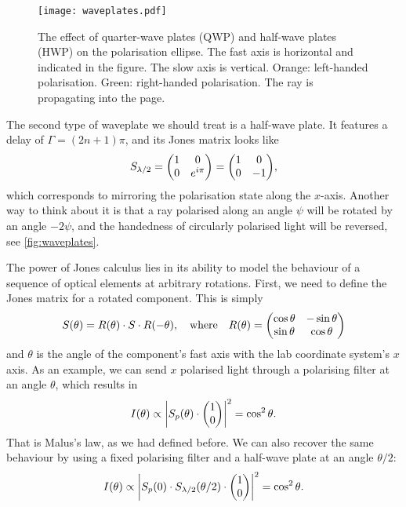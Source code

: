 \begin{figure}
	\centering
	\texttt{[image: waveplates.pdf]}
	\caption{
		The effect of quarter-wave plates (QWP) and half-wave plates (HWP) on the polarisation ellipse. The fast axis is horizontal and indicated in the figure. The slow axis is vertical. Orange: left-handed polarisation. Green: right-handed polarisation. The ray is propagating into the page.
	}
	\label{fig:waveplates}
\end{figure}

The second type of waveplate we should treat is a half-wave plate. It features a delay of $ \Gamma = (2n+1)\pi $, and its Jones matrix looks like
\begin{equation}
	S_\hwp = \mqty(1 & 0 \\ 0 & e^{i\pi}) = \mqty(1 & 0 \\ 0 & -1),
\end{equation}
which corresponds to mirroring the polarisation state along the $ x $-axis. Another way to think about it is that a ray polarised along an angle $ \psi $ will be rotated by an angle $ -2\psi $, and the handedness of circularly polarised light will be reversed, see \autoref{fig:waveplates}.

The power of Jones calculus lies in its ability to model the behaviour of a sequence of optical elements at arbitrary rotations. First, we need to define the Jones matrix for a rotated component. This is simply
\begin{equation}
	S(\theta) = R(\theta) \cdot S \cdot R(-\theta),
	\qq{where} 
	R(\theta) = \mqty(\cos\theta & -\sin\theta \\ \sin\theta & \cos\theta)
\end{equation}
and $ \theta $ is the angle of the component's fast axis with the lab coordinate system's $ x $ axis. As an example, we can send $ x $ polarised light through a polarising filter at an angle $ \theta $, which results in
\begin{equation}
	I(\theta) \propto \abs{S_p(\theta) \cdot \mqty(1 \\ 0)}^2 = \cos^2\theta.
\end{equation}
That is Malus's law, as we had defined before. We can also recover the same behaviour by using a fixed polarising filter and a half-wave plate at an angle $ \theta/2 $:
\begin{equation}
	I(\theta) \propto \abs{S_p(0) \cdot S_\hwp(\theta/2) \cdot \mqty(\admat{1 \\ 0})}^2 = \cos^2\theta.
\end{equation}

